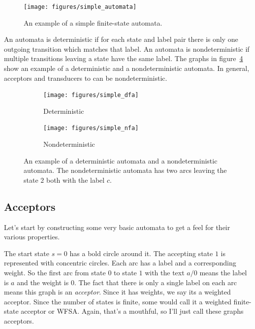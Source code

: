 \begin{figure}
    \centering
    \texttt{[image: figures/simple\_automata]}
    \caption{An example of a simple finite-state automata.}
    \label{fig:simple_automata}
 \end{figure}

An automata is deterministic if for each state and label pair there is only one
outgoing transition which matches that label. An automata is nondeterministic
if multiple transitions leaving a state have the same label. The graphs in
figure~\ref{fig:dfa_nfa} show an example of a deterministic and a
nondeterministic automata. In general, acceptors and transducers to can be
nondeterministic.

\begin{figure}
    \centering
    \begin{subfigure}[b]{0.48\textwidth}
        \texttt{[image: figures/simple\_dfa]}
        \caption{Deterministic}
        \label{fig:simple_dfa}
    \end{subfigure}
    \begin{subfigure}[b]{0.48\textwidth}
        \texttt{[image: figures/simple\_nfa]}
        \caption{Nondeterministic}
        \label{fig:simple_nfa}
    \end{subfigure}
    \caption{An example of a deterministic automata and a
    nondeterministic automata. The nondeterministic automata has
    two arcs leaving the state $2$ both with the label $c$.}
    \label{fig:dfa_nfa}
\end{figure}

\subsection{Acceptors}

Let's start by constructing some very basic automata to get a feel for their
various properties.

The start state $s = 0$ has a bold circle around it. The accepting state $1$ is
represented with concentric circles. Each arc has a label and a corresponding
weight. So the first arc from state $0$ to state $1$ with the text $a/0$ means
the label is $a$ and the weight is $0$. The fact that there is only a single
label on each arc means this graph is an \emph{acceptor}. Since it has weights,
we say its a weighted acceptor. Since the number of states is finite, some
would call it a weighted finite-state acceptor or WFSA. Again, that's a
mouthful, so I'll just call these graphs acceptors.

